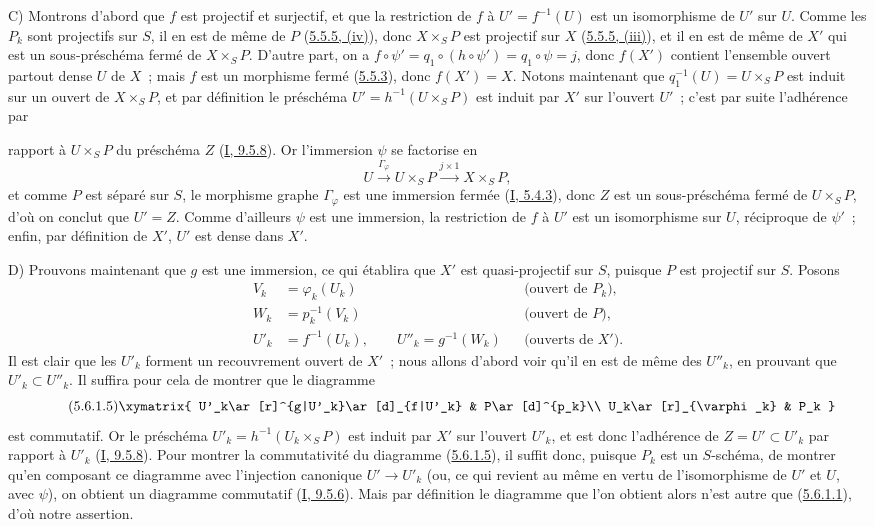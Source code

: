 C) Montrons d'abord que $f$ est projectif et surjectif, et que la restriction
de $f$ à $U'=f^{-1}(U)$ est un isomorphisme de $U'$ sur $U$. Comme les $P_k$
sont projectifs sur $S$, il en est de même de $P$
(\hyperref[II.5.5.5-fr]{5.5.5, (iv)}), donc $X\times_SP$ est projectif sur
$X$ (\hyperref[II.5.5.5-fr]{5.5.5, (iii)}), et il en est de même de $X'$ qui
est un sous-préschéma fermé de $X\times_SP$. D'autre part, on a
$f\circ\psi'=q_1\circ(h\circ\psi')=q_1\circ\psi=j$, donc $f(X')$ contient
l'ensemble ouvert partout dense $U$ de $X$~; mais $f$ est un morphisme fermé
(\hyperref[II.5.5.3-fr]{5.5.3}), donc $f(X')=X$. Notons maintenant que
$q_1^{-1}(U)=U\times_SP$ est induit sur un ouvert de $X\times_SP$, et par
définition le préschéma $U'=h^{-1}(U\times_SP)$ est induit par $X'$ sur
l'ouvert $U'$~; c'est par suite l'adhérence par


rapport à $U\times_SP$ du préschéma $Z$
(\hyperref[I.9.5.8-fr]{I, 9.5.8}). Or l'immersion $\psi$ se factorise en
\[
U\xrightarrow{\Gamma_\varphi}U\times_SP\xrightarrow{j\times1}X\times_SP,
\]
et comme $P$ est séparé sur $S$, le morphisme graphe $\Gamma_\varphi$ est une
immersion fermée (\hyperref[I.5.4.3-fr]{I, 5.4.3}), donc $Z$ est un
sous-préschéma fermé de $U\times_SP$, d'où on conclut que $U'=Z$. Comme
d'ailleurs $\psi$ est une immersion, la restriction de $f$ à $U'$ est un
isomorphisme sur $U$, réciproque de $\psi'$~; enfin, par définition de $X'$,
$U'$ est dense dans $X'$.

D) Prouvons maintenant que $g$ est une immersion, ce qui établira que $X'$ est
quasi-projectif sur $S$, puisque $P$ est projectif sur $S$. Posons
\begin{align*}
V_k&=\varphi_k(U_k) &&\text{(ouvert de $P_k$)},\\
W_k&=p_k^{-1}(V_k) &&\text{(ouvert de $P$)},\\
U'_k&=f^{-1}(U_k),\qquad U''_k=g^{-1}(W_k)
&&\text{(ouverts de $X'$)}.
\end{align*}
Il est clair que les $U'_k$ forment un recouvrement ouvert de $X'$~; nous
allons d'abord voir qu'il en est de même des $U''_k$, en prouvant que
$U'_k\subset U''_k$. Il suffira pour cela de montrer que le diagramme
\[
\tag{5.6.1.5}
\label{II.5.6.1.5-fr}
\xymatrix{
U'_k\ar[r]^{g|U'_k}\ar[d]_{f|U'_k} & P\ar[d]^{p_k}\\
U_k\ar[r]_{\varphi_k} & P_k
}
\]
est commutatif. Or le préschéma $U'_k=h^{-1}(U_k\times_SP)$ est induit par
$X'$ sur l'ouvert $U'_k$, et est donc l'adhérence de $Z=U'\subset U'_k$ par
rapport à $U'_k$ (\hyperref[I.9.5.8-fr]{I, 9.5.8}). Pour montrer la
commutativité du diagramme (\hyperref[II.5.6.1.5-fr]{5.6.1.5}), il suffit
donc, puisque $P_k$ est un $S$-schéma, de montrer qu'en composant ce diagramme
avec l'injection canonique $U'\to U'_k$ (ou, ce qui revient au même en vertu de
l'isomorphisme de $U'$ et $U$, avec $\psi$), on obtient un diagramme commutatif
(\hyperref[I.9.5.6-fr]{I, 9.5.6}). Mais par définition le diagramme que l'on
obtient alors n'est autre que (\hyperref[II.5.6.1.1-fr]{5.6.1.1}), d'où notre
assertion.

